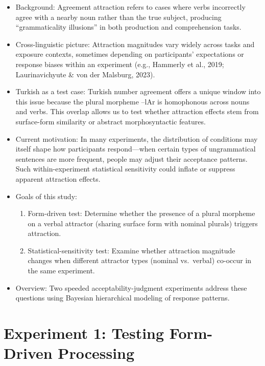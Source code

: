 \documentclass[
  authoryear,
  preprint]{elsarticle}
\providecommand{\tightlist}{%
  \setlength{\itemsep}{0pt}\setlength{\parskip}{0pt}}
\begin{document}
\begin{itemize}
\tightlist
\item
  Background: Agreement attraction refers to cases where verbs
  incorrectly agree with a nearby noun rather than the true subject,
  producing ``grammaticality illusions'' in both production and
  comprehension tasks.
\item
  Cross-linguistic picture: Attraction magnitudes vary widely across
  tasks and exposure contexts, sometimes depending on participants'
  expectations or response biases within an experiment (e.g., Hammerly
  et al., 2019; Laurinavichyute \& von der Malsburg, 2023).
\item
  Turkish as a test case: Turkish number agreement offers a unique
  window into this issue because the plural morpheme --lAr is
  homophonous across nouns and verbs. This overlap allows us to test
  whether attraction effects stem from surface-form similarity or
  abstract morphosyntactic features.
\item
  Current motivation: In many experiments, the distribution of
  conditions may itself shape how participants respond---when certain
  types of ungrammatical sentences are more frequent, people may adjust
  their acceptance patterns. Such within-experiment statistical
  sensitivity could inflate or suppress apparent attraction effects.
\item
  Goals of this study:

  \begin{enumerate}
  \def\labelenumi{\arabic{enumi}.}
  \tightlist
  \item
    Form-driven test: Determine whether the presence of a plural
    morpheme on a verbal attractor (sharing surface form with nominal
    plurals) triggers attraction.
  \item
    Statistical-sensitivity test: Examine whether attraction magnitude
    changes when different attractor types (nominal vs.~verbal) co-occur
    in the same experiment.
  \end{enumerate}
\item
  Overview: Two speeded acceptability-judgment experiments address these
  questions using Bayesian hierarchical modeling of response patterns.
\end{itemize}

\section{Experiment 1: Testing Form-Driven
Processing}\label{experiment-1-testing-form-driven-processing}
\end{document}
